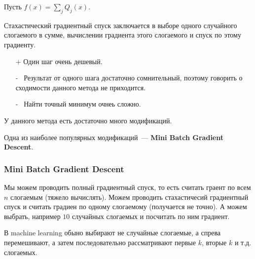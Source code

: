 \begin{definition}
    Пусть $f(x) = \sum\limits_j Q_j (x)$.

    Стахастический градиентный спуск заключается в выборе одного случайного слогаемого в сумме, вычислении градиента этого слогаемого и спуск по этому градиенту.
\end{definition}

\begin{itemize}
    \item[+] Один шаг очень дешевый.
    \item[-~] Результат от одного шага достаточно сомнительный,  поэтому говорить о сходимости данного метода не приходится.
    \item[-~] Найти точный минимум очнеь сложно.
\end{itemize}

У данного метода есть достаточно много модификаций.

Одна из наиболее популярных модификаций~--- \textbf{Mini Batch Gradient Descent}.
\subsubsection{Mini Batch Gradient Descent}
Мы можем проводить полный градиентный спуск, то есть считать граент по всем $n$ слогаемым (тяжело вычислять). Можем проводить стахастичесий градиентный спуск и считать градиен по одному слогаемому (получается не точно). А можем выбрать, например $10$ случайных слогаемых и посчитать по ним градиент.

В machine learning обыно выбирают не случайные слогаемые, а спрева перемешивают, а затем последовательно рассматривают первые $k$, вторые $k$ и т.д. слогаемых.
